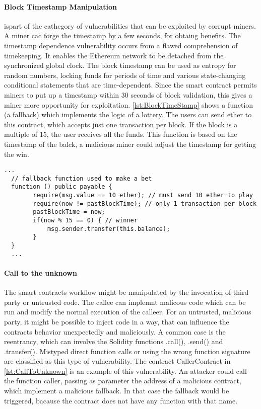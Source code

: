 \documentclass[a4paper,sigconf, language=french,
language=german, language=spanish, language=english]{acmart}
\begin{document}
\paragraph{Block Timestamp Manipulation} ispart of the cathegory of vulnerabilities that can be exploited by corrupt miners. 
A miner cac forge the timestamp by a few seconds, for obtaing benefits. 
The timestamp dependence vulnerability occurs from a flawed comprehension of timekeeping. It enables the Ethereum
network to be detached from the synchronized global clock. 
The block timestamp can be used as entropy for random numbers, locking funds for periods of time and various state-changing 
conditional statements that are time-dependent. Since the smart contract permits miners to put up a
timestamp within 30 seconds of block validation, this gives a miner more opportunity for exploitation.
\autoref{lst:BlockTimeStamp} shows a function (a fallback) which implements the logic of a lottery. The users can send ether to this contract, which 
accepts just one transaction per block. If the block is a multiple of 15, the user receives all the funds. This function is based on the timestamp of the balck, 
a malicious miner could adjust the timestamp for getting the win.
\begin{lstlisting}[language=Solidity,caption={Block Timestamp},label={lst:BlockTimeStamp}]
  ...  
  // fallback function used to make a bet
  function () public payable {
        require(msg.value == 10 ether); // must send 10 ether to play
        require(now != pastBlockTime); // only 1 transaction per block
        pastBlockTime = now;
        if(now % 15 == 0) { // winner
            msg.sender.transfer(this.balance);
        }
  }
  ...
\end{lstlisting}

\paragraph{Call to the unknown} The smart contracts workflow might be manipulated by 
the invocation of third party or untrusted code. The callee can implemnt malicous code which can be run and 
modify the normal execution of the calleer. For an untrusted, malicious
party, it might be possible to inject code in a way, that can inﬂuence the contracts behavior unexpectedly
and maliciously. A common case is the reentrancy, which can involve the Solidity functions .call(), .send() and .transfer(). 
Mistyped direct function calls or using the wrong function signature are classified as this type of vulnerability. 
The contract CallerContract in \autoref{lst:CallToUnknown} is an example of this vulnerability. An attacker could call the function caller, passing 
as parameter the address of a malicious contract, which implement a malicious fallback. In that case the fallback would be triggered, bacause the contract 
does not have any function with that name.
\end{document}
